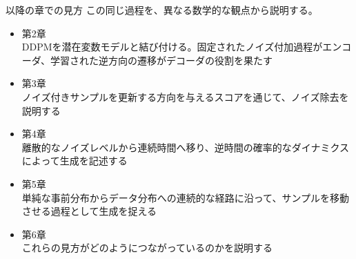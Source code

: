 \begin{frame}{以降の章での見方}
    この同じ過程を、異なる数学的な観点から説明する。
    \vspace{0.4em}
    \begin{itemize}
        \item 第2章\\
        DDPMを潜在変数モデルと結び付ける。固定されたノイズ付加過程がエンコーダ、学習された逆方向の遷移がデコーダの役割を果たす
        \item 第3章\\
        ノイズ付きサンプルを更新する方向を与えるスコアを通じて、ノイズ除去を説明する
        \item 第4章\\
        離散的なノイズレベルから連続時間へ移り、逆時間の確率的なダイナミクスによって生成を記述する
        \item 第5章\\
        単純な事前分布からデータ分布への連続的な経路に沿って、サンプルを移動させる過程として生成を捉える
        \item 第6章\\
        これらの見方がどのようにつながっているのかを説明する
    \end{itemize}
\end{frame}